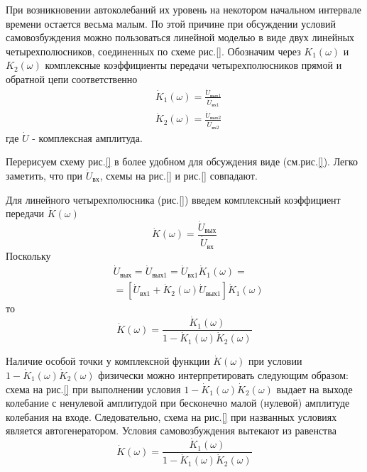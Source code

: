 При возникновении автоколебаний их уровень на некотором начальном интервале времени остается весьма малым. По этой причине при обсуждении условий самовозбуждения можно пользоваться линейной моделью в виде двух линейных четырехполюсников, соединенных по схеме рис.\ref{}. Обозначим через $K_1(\omega)$ и $K_2(\omega)$ комплексные коэффициенты передачи четырехполюсников прямой и обратной цепи соответственно
\begin{equation*}
\begin{aligned*}
&\dot{K}_1(\omega)=\frac{\dot{U}_{\text{вых}1}}{\dot{U}_{\text{вх}1}} \\
&\dot{K}_2(\omega)=\frac{\dot{U}_{\text{вых}2}}{\dot{U}_{\text{вх}2}} 
\end{aligned*}
\end{equation*}
где $\dot{U}$ - комплексная амплитуда.

Перерисуем схему рис.\ref{} в более удобном для обсуждения виде (см.рис.\ref{}). Легко заметить, что при $\dot{U}_\text{вх}$, схемы на рис.\ref{} и рис.\ref{} совпадают.

Для линейного четырехполюсника (рис.\ref{}) введем комплексный коэффициент передачи $\dot{K}(\omega)$
\begin{equation*}
\dot{K}(\omega)=\frac{\dot{U}_\text{вых}}{\dot{U}_\text{вх}}
\end{equation*}
Поскольку
\begin{equation*}
\begin{aligned}
&\dot{U}_\text{вых}=\dot{U}_{\text{вых}1}=\dot{U}_{\text{вх}1}\dot{K}_1(\omega)=\\
&= [\dot{U}_{\text{вх}1}+\dot{K}_2(\omega)\dot{U}_{\text{вых}1}]\dot{K}_1(\omega)
\end{aligned}
\end{equation*}
то 
\begin{equation*}
\dot{K}(\omega)=\frac{\dot{K}_1(\omega)}{1-\dot{K}_1(\omega)\dot{K}_2(\omega)}
\end{equation*}

Наличие особой точки у комплексной функции $\dot{K}(\omega)$ при условии $1-\dot{K}_1(\omega)\dot{K}_2(\omega)$ физически можно интерпретировать следующим образом: схема на рис.\ref{} при выполнении условия $1-\dot{K}_1(\omega)\dot{K}_2(\omega)$ выдает на выходе колебание с ненулевой амплитудой при бесконечно малой (нулевой) амплитуде колебания на входе. Следовательно, схема  на рис.\ref{} при названных условиях является автогенератором.
Условия самовозбуждения вытекают из равенства
\begin{equation*}
\dot{K}(\omega)=\frac{\dot{K}_1(\omega)}{1-\dot{K}_1(\omega)\dot{K}_2(\omega)}
\end{equation*}

